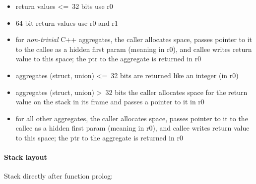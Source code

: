 \begin{itemize}
\item return values \textless=\ 32 bits use r0
\item 64 bit return values use r0 and r1
\item for {\it non-trivial} C++ aggregates, the caller allocates space, passes pointer to it to the callee as a hidden first param
(meaning in r0), and callee writes return value to this space; the ptr to the aggregate is returned in r0
\item aggregates (struct, union) \textless=\ 32 bits are returned like an integer (in r0)
\item aggregates (struct, union) \textgreater\ 32 bits the caller allocates space for the return value on the stack in its frame and passes a pointer to it in r0
\item for all other aggregates, the caller allocates space, passes pointer to it to the callee as a hidden first param (meaning in r0), and callee writes return value to this space; the ptr to the aggregate is returned in r0
\end{itemize}

\paragraph{Stack layout}

Stack directly after function prolog:\\

